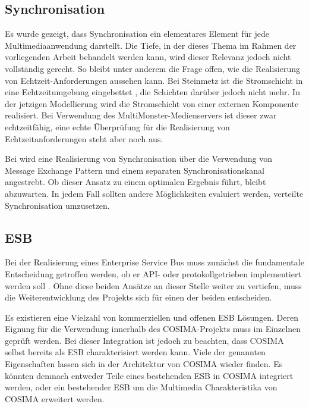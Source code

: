 
\subsection{Synchronisation} %
\label{sub:synchronisation}

  Es wurde gezeigt, dass Synchronisation ein elementares Element für jede Multimediaanwendung darstellt. Die Tiefe, in der dieses Thema im Rahmen der vorliegenden Arbeit behandelt werden kann, wird dieser Relevanz jedoch nicht vollständig gerecht. So bleibt unter anderem die Frage offen, wie die Realisierung von Echtzeit-Anforderungen aussehen kann. Bei Steinmetz ist die Stromschicht in eine Echtzeitumgebung eingebettet \citep[S. 604]{multimedia_technologie}, die Schichten darüber jedoch nicht mehr. In der jetzigen Modellierung wird die Stromschicht von einer externen Komponente realisiert. Bei Verwendung des MultiMonster-Medienservers ist dieser zwar echtzeitfähig, eine echte Überprüfung für die Realisierung von Echtzeitanforderungen steht aber noch aus.
  
  Bei \citep{antons09} wird eine Realisierung von Synchronisation über die Verwendung von Message Exchange Pattern und einem separaten Synchronisationskanal angestrebt. Ob dieser Ansatz zu einem optimalen Ergebnis führt, bleibt abzuwarten. In jedem Fall sollten andere Möglichkeiten evaluiert werden, verteilte Synchronisation umzusetzen.


\subsection{ESB} %
\label{sub:esb_fragen}

  Bei der Realisierung eines Enterprise Service Bus muss zunächst die fundamentale Entscheidung getroffen werden, ob er API- oder protokollgetrieben implementiert werden soll \citep[S. 59]{soa_in_practice}. Ohne diese beiden Ansätze an dieser Stelle weiter zu vertiefen, muss die Weiterentwicklung des Projekts sich für einen der beiden entscheiden.
  
  Es existieren eine Vielzahl von kommerziellen und offenen ESB Lösungen. Deren Eignung für die Verwendung innerhalb des COSIMA-Projekts muss im Einzelnen geprüft werden. Bei dieser Integration ist jedoch zu beachten, dass COSIMA selbst bereits als ESB charakterisiert werden kann. Viele der genannten Eigenschaften lassen sich in der Architektur von COSIMA wieder finden. Es könnten demnach entweder Teile eines bestehenden ESB in COSIMA integriert werden, oder ein bestehender ESB um die Multimedia Charakteristika von COSIMA erweitert werden.



